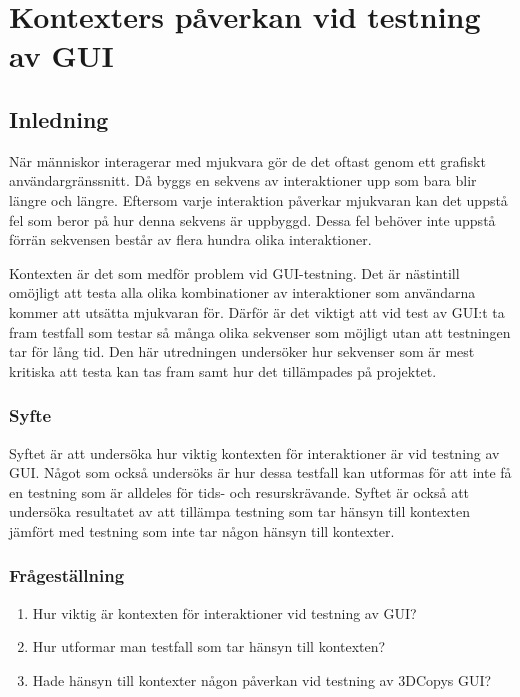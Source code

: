 \chapter{Kontexters påverkan vid testning av GUI}
\label{cha:indiv-report-holmberg}

\section{Inledning}
\label{sec:introduction-holmberg}

När människor interagerar med mjukvara gör de det oftast genom ett grafiskt användargräns\-snitt. Då byggs en sekvens av interaktioner upp som bara blir längre och längre. Eftersom varje interaktion påverkar mjukvaran kan det uppstå fel som beror på hur denna sekvens är uppbyggd. Dessa fel behöver inte uppstå förrän sekvensen består av flera hundra olika interaktioner.

Kontexten är det som medför problem vid GUI-testning. Det är nästintill omöjligt att testa alla olika kombinationer av interaktioner som användarna kommer att utsätta mjukvaran för. Därför är det viktigt att vid test av GUI:t ta fram testfall som testar så många olika sekvenser som möjligt utan att testningen tar för lång tid. Den här utredningen undersöker hur sekvenser som är mest kritiska att testa kan tas fram samt hur det tillämpades på projektet.

\subsection{Syfte}
\label{sec:purpose-holmberg}

Syftet är att undersöka hur viktig kontexten för interaktioner är vid testning av GUI. Något som också undersöks är hur dessa testfall kan utformas för att inte få en testning som är alldeles för tids- och resurskrävande. Syftet är också att undersöka resultatet av att tillämpa testning som tar hänsyn till kontexten jämfört med testning som inte tar någon hänsyn till kontexter.

\subsection{Frågeställning}
\label{sec:issue-holmberg}

\begin{enumerate}
	\item Hur viktig är kontexten för interaktioner vid testning av GUI?
	\item Hur utformar man testfall som tar hänsyn till kontexten?
	\item Hade hänsyn till kontexter någon påverkan vid testning av 3DCopys GUI?
\end{enumerate}

